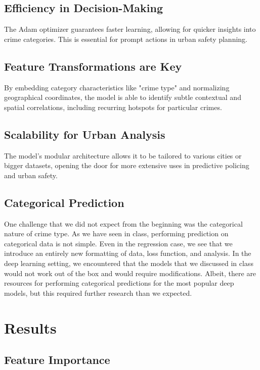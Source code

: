 \documentclass{article}
\begin{document}
\subsection{Efficiency in Decision-Making}
The Adam optimizer guarantees faster learning, allowing for quicker insights into crime categories. This is essential for prompt actions in urban safety planning.

\subsection{Feature Transformations are Key}
By embedding category characteristics like "crime type" and normalizing geographical coordinates, the model is able to identify subtle contextual and spatial correlations, including recurring hotspots for particular crimes.

\subsection{Scalability for Urban Analysis}
The model's modular architecture allows it to be tailored to various cities or bigger datasets, opening the door for more extensive uses in predictive policing and urban safety.

\subsection{Categorical Prediction}
One challenge that we did not expect from the beginning was the categorical nature of crime type. As we have seen in class, performing prediction on categorical data is not simple. Even in the regression case, we see that we introduce an entirely new formatting of data, loss function, and analysis. In the deep learning setting, we encountered that the models that we discussed in class would not work out of the box and would require modifications. Albeit, there are resources for performing categorical predictions for the most popular deep models, but this required further research than we expected. 

\section{Results}

\subsection{Feature Importance}
\end{document}
